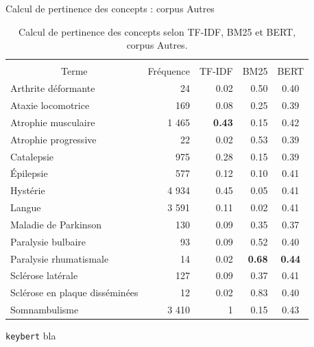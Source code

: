 \begin{frame}{Calcul de pertinence des concepts : corpus \og{}Autres\fg{}}
    \footnotesize
\begin{table}[]
\begin{tabular}{|l|cccc|}
\hline
\multicolumn{1}{|c|}{{ }} &
  \multicolumn{4}{c|}{\cellcolor[HTML]{DAE8FC}{ Corpus \og{}Autres\fg{}}} \\ \cline{2-5} 
\multicolumn{1}{|c|}{\multirow{}{}{{Terme}}} &
  {Fréquence} &
  {TF-IDF} &
  {BM25} &
  {BERT} \\ \hline
{Arthrite déformante} &
  \multicolumn{1}{|r|}{{24}} &
  \multicolumn{1}{|r|}{{0.02}} &
  \multicolumn{1}{|r|}{{0.50}} &
  {0.40} \\ \hline
{Ataxie locomotrice} &
  \multicolumn{1}{|r|}{{169}} &
  \multicolumn{1}{|r|}{{0.08}} &
  \multicolumn{1}{|r|}{{0.25}} &
  {0.39} \\ \hline
{Atrophie musculaire} &
  \multicolumn{1}{|r|}{{1 465}} &
  \multicolumn{1}{|r|}{{\textbf{0.43}}} &
  \multicolumn{1}{|r|}{{0.15}} &
  {0.42} \\ \hline
{Atrophie progressive} &
  \multicolumn{1}{|r|}{{22}} &
  \multicolumn{1}{|r|}{{0.02}} &
  \multicolumn{1}{|r|}{{0.53}} &
  {0.39} \\ \hline
{Catalepsie} &
  \multicolumn{1}{|r|}{{975}} &
  \multicolumn{1}{|r|}{{0.28}} &
  \multicolumn{1}{|r|}{{0.15}} &
  {0.39} \\ \hline
{Épilepsie} &
  \multicolumn{1}{|r|}{{577}} &
  \multicolumn{1}{|r|}{{0.12}} &
  \multicolumn{1}{|r|}{{0.10}} &
  {0.41} \\ \hline
{Hystérie} &
  \multicolumn{1}{|r|}{{4 934}} &
  \multicolumn{1}{|r|}{{0.45}} &
  \multicolumn{1}{|r|}{{0.05}} &
  {0.41} \\ \hline
{Langue} &
  \multicolumn{1}{|r|}{{3 591}} &
  \multicolumn{1}{|r|}{{0.11}} &
  \multicolumn{1}{|r|}{{0.02}} &
  {0.41} \\ \hline
{Maladie de Parkinson} &
  \multicolumn{1}{|r|}{{130}} &
  \multicolumn{1}{|r|}{{0.09}} &
  \multicolumn{1}{|r|}{{0.35}} &
  {0.37} \\ \hline
{Paralysie bulbaire} &
  \multicolumn{1}{|r|}{{93}} &
  \multicolumn{1}{|r|}{{0.09}} &
  \multicolumn{1}{|r|}{{0.52}} &
  {0.40} \\ \hline
{Paralysie rhumatismale} &
  \multicolumn{1}{|r|}{{14}} &
  \multicolumn{1}{|r|}{{0.02}} &
  \multicolumn{1}{|r|}{{\textbf{0.68}}} &
  {\textbf{0.44}} \\ \hline
{Sclérose latérale} &
  \multicolumn{1}{|r|}{{127}} &
  \multicolumn{1}{|r|}{{0.09}} &
  \multicolumn{1}{|r|}{{0.37}} &
  {0.41} \\ \hline
{Sclérose en plaque disséminées} &
  \multicolumn{1}{|r|}{{12}} &
  \multicolumn{1}{|r|}{{0.02}} &
  \multicolumn{1}{|r|}{{0.83}} &
  {0.40} \\ \hline
{Somnambulisme} &
  \multicolumn{1}{|r|}{{3 410}} &
  \multicolumn{1}{|r|}{{1}} &
  \multicolumn{1}{|r|}{{0.15}} &
  {0.43} \\ \hline
\end{tabular}
\caption{Calcul de pertinence des concepts selon TF-IDF, BM25 et BERT, corpus \og{}Autres\fg{}.}
\end{table}
\end{frame}

\begin{frame}{\texttt{keybert}}
bla
\end{frame}
